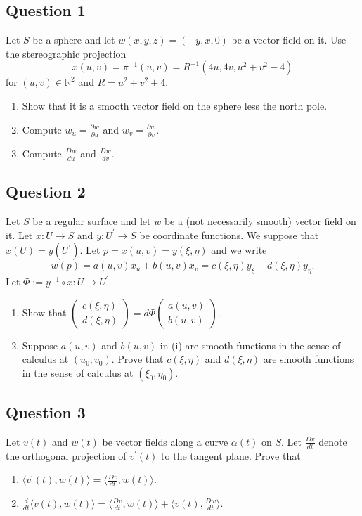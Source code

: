 \documentclass[12pt, a4paper]{article}
\newcommand{\R}{\mathbb{R}}
\newcommand{\inner}[1]{\langle #1 \rangle}
\begin{document}
\subsection*{Question 1}
Let $S$ be a sphere and let $w(x,y,z)=(-y,x,0)$ be a vector field on it. Use the stereographic projection
\[ x(u,v)=\pi^{-1}(u,v)=R^{-1}(4u,4v,u^{2}+v^{2}-4) \]
for $(u,v)\in\R^{2}$ and $R=u^{2}+v^{2}+4$.
\begin{enumerate}[label=(\roman*)]
    \item Show that it is a smooth vector field on the sphere less the north pole.
    \item Compute $w_{u}=\frac{\partial w}{\partial u}$ and $w_{v}=\frac{\partial w}{\partial v}$.
    \item Compute $\frac{Dw}{du}$ and $\frac{Dw}{dv}$.
\end{enumerate}
\newpage

\subsection*{Question 2}
Let $S$ be a regular surface and let $w$ be a (not necessarily smooth) vector field on it. Let $x: U\rightarrow S$ and $y:U^{\prime}\rightarrow S$ be coordinate functions. We suppose that $x(U)=y(U^{\prime})$. Let $p=x(u,v)=y(\xi,\eta)$ and we write
\[ w(p)=a(u,v)x_{u}+b(u,v)x_{v}=c(\xi,\eta)y_{\xi}+d(\xi,\eta)y_{\eta}. \]
Let $\Phi:=y^{-1}\circ x:U\rightarrow U^{\prime}$.
\begin{enumerate}[label=(\roman*)]
    \item Show that $\begin{pmatrix}c(\xi,\eta)\\ d(\xi,\eta)\end{pmatrix}=d\Phi\begin{pmatrix}a(u,v)\\ b(u,v)\end{pmatrix}$.
    \item Suppose $a(u,v)$ and $b(u,v)$ in (i) are smooth functions in the sense of calculus at $(u_{0},v_{0})$. Prove that $c(\xi,\eta)$ and $d(\xi,\eta)$ are smooth functions in the sense of calculus at $(\xi_{0},\eta_{0})$.
\end{enumerate}
\newpage

\subsection*{Question 3}
Let $v(t)$ and $w(t)$ be vector fields along a curve $\alpha(t)$ on $S$. Let $\frac{Dv}{dt}$ denote the orthogonal projection of $v^{\prime}(t)$ to the tangent plane. Prove that
\begin{enumerate}[label=(\roman*)]
    \item $\inner{v^{\prime}(t),w(t)}=\inner{\frac{Dv}{dt},w(t)}$.
    \item $\frac{d}{dt}\inner{v(t),w(t)}=\inner{\frac{Dv}{dt},w(t)}+\inner{v(t),\frac{Dw}{dt}}$.
\end{enumerate}
\newpage
\end{document}
